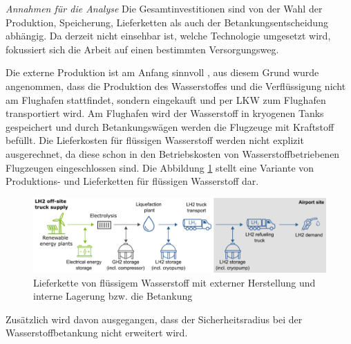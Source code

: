 \textit{Annahmen für die Analyse}
Die Gesamtinvestitionen sind von der Wahl der Produktion, Speicherung, 
Lieferketten als auch der Betankungsentscheidung abhängig.
Da derzeit nicht einsehbar ist, welche Technologie umgesetzt wird, 
fokussiert sich die Arbeit auf einen bestimmten Versorgungsweg.

Die externe Produktion ist am Anfang sinnvoll \cite{colpan2022fuel}, 
aus diesem Grund wurde angenommen, dass die Produktion des Wasserstoffes 
und die Verflüssigung nicht am Flughafen stattfindet, 
sondern eingekauft und per LKW zum Flughafen transportiert wird.
Am Flughafen wird der Wasserstoff in kryogenen Tanks gespeichert 
und durch Betankungswägen werden die Flugzeuge mit Kraftstoff befüllt.
%
Die Lieferkosten für flüssigen Wasserstoff  werden nicht explizit ausgerechnet,
da diese schon in den Betriebskosten von Wasserstoffbetriebenen Flugzeugen eingeschlossen sind.
%
Die Abbildung \ref{supply_wasserstoff} stellt eine Variante von Produktions- und Lieferketten für flüssigen Wasserstoff dar.
\begin{figure}[h]
	\centering
	\includegraphics[width=0.9\linewidth]{Bilder/Supply_hydrogen.png}
	\caption[Lieferkette von flüssigem Wasserstoff mit externer Herstellung und interner Lagerung bzw. die Betankung]{Lieferkette von flüssigem Wasserstoff mit externer Herstellung und interne Lagerung bzw. die Betankung \cite{schenke2024lh2}}
	\label{supply_wasserstoff}
\end{figure}

Zusätzlich wird davon ausgegangen, dass der Sicherheitsradius bei der Wasserstoffbetankung nicht erweitert wird.
